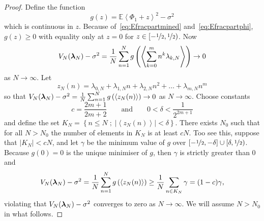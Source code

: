 \documentclass[aap,preprint]{imsart}
\newcommand{\expect}{{\mathbb E}}
\renewcommand{\mid}{\; ; \;}
\newcommand{\fracpart}[1]{\left\langle #1 \right\rangle}
\newcommand{\sabs}[1]{\vert #1 \vert}
\begin{document}
\begin{proof}
Define the function
\begin{equation}\label{eq:gz}
g(z) = \expect\fracpart{\Phi_1 + z}^2 - \sigma^2
\end{equation}
which is continuous in $z$. Because of~\eqref{eq:Efracpartmined} and~\eqref{eq:Efracpartphi}, $g(z) \geq 0$ with equality only at $z = 0$ for $z \in [-\nicefrac{1}{2}, \nicefrac{1}{2})$. Now
\[
V_N(\lambdabf_N) - \sigma^2 = \frac{1}{N}\sum_{n=1}^{N} g\left( \fracpart{ \sum_{k=0}^{m}{n^k \lambda_{k,N}} } \right) \rightarrow 0
\]
as $N \rightarrow \infty$. Let
\[
z_N(n) = \lambda_{0,N} + \lambda_{1,N} n + \lambda_{2,N} n^2 + \dots + \lambda_{m,N} n^m
\]
so that $V_N(\lambdabf_N) - \sigma^2 = \frac{1}{N}\sum_{n=1}^{N} g\left( \fracpart{z_N(n)} \right) \rightarrow 0$ as $N \rightarrow \infty$.
Choose constants 
\[
c = \frac{2m+1}{2m+2} \qquad \text{and} \qquad 0 < \delta < \frac{1}{2^{2m+1}}
\]
and define the set $K_{N}=\left\{  n\leq N \mid \sabs{\fracpart{z_N(n)}} < \delta \right\}$.  There exists $N_0$ such that for all $N > N_0$ the number of elements in $K_N$ is at least $cN$.  Too see this, suppose that $\sabs{K_N} < cN$, and let $\gamma$ be the minimum value of $g$ over $[-\nicefrac{1}{2},-\delta] \cup [\delta, \nicefrac{1}{2})$. Because $g(0) = 0$ is the unique minimiser of $g$, then $\gamma$ is strictly greater than $0$ and
\begin{align*}
V_N(\lambdabf_N) - \sigma^2 = \frac{1}{N}\sum_{n=1}^{N} g\left( \fracpart{z_N(n)} \right) \geq \frac{1}{N}\sum_{n\in K_N} \gamma = (1-c)\gamma,
\end{align*}
violating that $V_N(\boldsymbol{\lambda}_N) - \sigma^2$ converges to zero as $N \rightarrow \infty$.  We will assume $N > N_0$ in what follows.


\end{proof}
\end{document}
